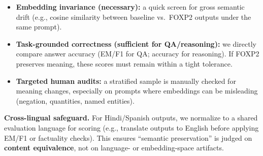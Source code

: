 \begin{itemize}[leftmargin=1.5em]
\begin{description}
\begin{itemize}[leftmargin=*,itemsep=2pt]
\item \textbf{Embedding invariance (necessary):} a quick screen for gross semantic drift (e.g., cosine similarity between baseline vs.\ FOXP2 outputs under the same prompt).
\item \textbf{Task-grounded correctness (sufficient for QA/reasoning):} we directly compare answer accuracy (EM/F1 for QA; accuracy for reasoning). If FOXP2 preserves meaning, these scores must remain within a tight tolerance.
\item \textbf{Targeted human audits:} a stratified sample is manually checked for meaning changes, especially on prompts where embeddings can be misleading (negation, quantities, named entities).
\end{itemize}

\textbf{Cross-lingual safeguard.} For Hindi/Spanish outputs, we normalize to a shared evaluation language for scoring (e.g., translate outputs to English before applying EM/F1 or factuality checks). This ensures “semantic preservation” is judged on \textbf{content equivalence}, not on language- or embedding-space artifacts.
\end{description}





\end{itemize}

